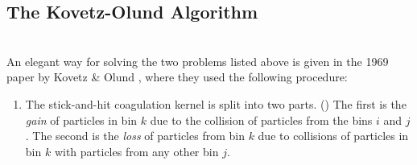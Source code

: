 
    \clearpage\subsection{The Kovetz-Olund Algorithm}

         \\
        
        An elegant way for solving the two problems listed above is given in the 1969 paper
        by Kovetz \& Olund \cite{kovetz_olund_1969}, where they used the following procedure:
        \begin{enumerate}
            \item The stick-and-hit coagulation kernel is split into two parts. 
                ()
                The first is the \textit{gain} of particles in bin $k$ due to the collision of 
                particles from the bins $i$ and $j$. The second is the \textit{loss} of particles 
                from bin $k$ due to collisions of particles in bin $k$ with particles from any 
                other bin $j$.
            

\end{enumerate}
